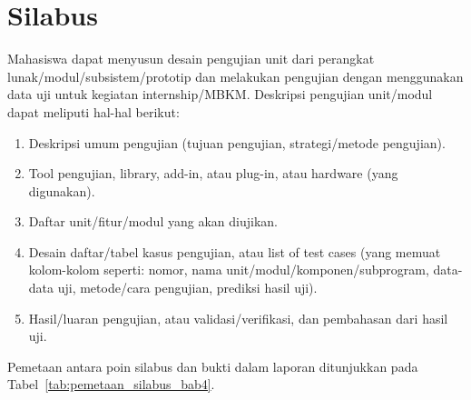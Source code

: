 \section{Silabus}
Mahasiswa dapat menyusun desain pengujian unit dari perangkat lunak\slash modul\slash subsistem\slash prototip dan melakukan pengujian dengan menggunakan data uji untuk kegiatan internship/MBKM. Deskripsi pengujian unit/modul dapat meliputi hal-hal berikut:
\begin{enumerate}
	\item Deskripsi umum pengujian (tujuan pengujian, strategi/metode pengujian).
	\item Tool pengujian, library, add-in, atau plug-in, atau hardware (yang digunakan).
	\item Daftar unit/fitur/modul yang akan diujikan.
	\item Desain daftar/tabel kasus pengujian, atau list of test cases (yang memuat kolom-kolom seperti: nomor, nama unit/modul/komponen/subprogram, data-data uji, metode/cara pengujian, prediksi hasil uji).
	\item Hasil/luaran pengujian, atau validasi/verifikasi, dan pembahasan dari hasil uji.
\end{enumerate}

Pemetaan antara poin silabus dan bukti dalam laporan ditunjukkan pada Tabel~\ref{tab:pemetaan_silabus_bab4}.

